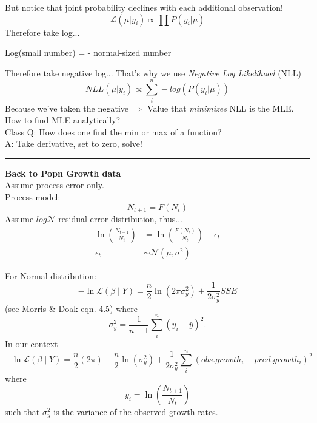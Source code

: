 \documentclass{article}
\newcommand{\note}[1]{\colorbox{gray!30}{#1}}
\newcommand{\ind}{\-\hspace{1cm}}
\begin{document}
But notice that joint probability declines with each additional observation!
\begin{equation*}
	\mathcal{L}(\mu \vert y_i) \propto \prod P(y_i \vert \mu)
\end{equation*}
Therefore take log...
\begin{center}
	Log(small number) = - normal-sized number
\end{center}
Therefore take negative log...
That's why we use \emph{Negative Log Likelihood} (NLL)
\begin{equation*}
	NLL(\mu \vert y_i) \propto \sum_i^n -log( P(y_i \vert \mu))
\end{equation*}
Because we've taken the negative $\Rightarrow$ Value that \emph{minimizes} NLL is the MLE.\\


How to find MLE analytically?\\
\note{Class Q:}  How does one find the min or max of a function?\\
\ind \note{A:} Take derivative, set to zero, solve!

\rule[0.5ex]{\linewidth}{1pt}
\textbf{Back to Popn Growth data}\\
Assume process-error only.\\
\ind Process model: 
\begin{equation*}
	N_{t+1} = F(N_t)
\end{equation*}
Assume $log\mathcal{N}$ residual error distribution, thus...
\begin{align*}
	\ln \left(\frac{N_{t+1}}{N_t}\right) &= \ln \left(\frac{F(N_t)}{N_t}\right) + \epsilon_t\\
	\epsilon_t &\sim \mathcal{N}(\mu,\sigma^2)
\end{align*}

For Normal distribution:
\begin{equation*}
	-\ln \mathcal{L}(\beta \mid Y) =  \frac{n}{2} \ln (2 \pi \sigma_y^2)  + \frac{1}{2 \sigma_y^2}  SSE
\end{equation*}
(see Morris \& Doak eqn. 4.5) where
\begin{equation*}
	\sigma_y^2  = \frac{1}{n-1} \sum_i^n (y_i - \bar{y})^2.
\end{equation*}
In our context
\begin{equation*}
	-\ln \mathcal{L}(\beta \mid Y) =  \frac{n}{2}(2 \pi) - \frac{n}{2} \ln(\sigma_y^2)  + \frac{1}{2 \sigma_y^2}  \sum_i^n (obs.growth_i- pred.growth_i)^2
\end{equation*}
where
\begin{equation*}
	y_i = \ln\left(\frac{N_{t+1}}{N_t}\right)
\end{equation*}
\ind such that $\sigma_y^2$ is the variance of the observed growth rates.\\
\end{document}
